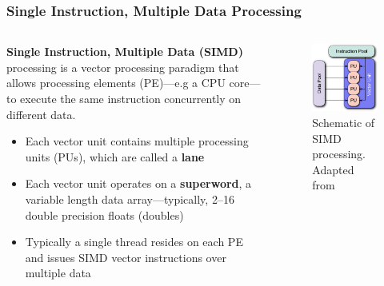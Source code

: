 \documentclass{beamer}
\newcounter{dummynote1}%
\newcounter{dummynote2}%
\begin{document}
\begin{frame}
 \frametitle{Single Instruction, Multiple Data Processing}
 \setcounter{dummynote1}{\value{footnote}}
 \addtocounter{dummynote1}{1}
 \begin{columns}
 \begin{column}{0.6\textwidth}
  \textbf{Single Instruction, Multiple Data (SIMD)} processing is a vector processing paradigm that allows processing elements (PE)---e.g a CPU core---to execute the same instruction concurrently on different data.
  \begin{itemize}
    \item Each vector unit contains multiple processing units (PUs), which are called a \textbf{lane}
    \item Each vector unit operates on a \textbf{superword}, a variable length data array---typically, \numrange{2}{16} double precision floats (doubles)
    \item Typically a single thread resides on each PE and issues SIMD vector instructions over multiple data
  \end{itemize}
 \end{column}
 \begin{column}{0.4\textwidth}
  \begin{figure}
    \centering
    \includegraphics[width=\columnwidth]{SIMD.pdf}
    \caption{Schematic of SIMD processing.  Adapted from\footnotemark[\value{dummynote1}]}
  \end{figure}
 \end{column}
 \end{columns}
 \setcounter{footnote}{\value{dummynote1}}
\end{frame}
\end{document}
